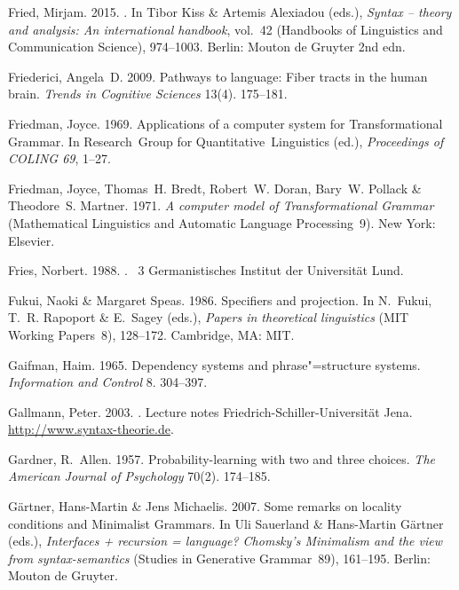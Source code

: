 \begin{thebibliography}{1420}
Fried, Mirjam. 2015.
.
\newblock In Tibor Kiss \& Artemis Alexiadou (eds.), \emph{Syntax -- theory and
  analysis: {An} international handbook}, vol.~42  (Handbooks of Linguistics
  and Communication Science), 974--1003. Berlin: Mouton de Gruyter 2nd edn.

Friederici, Angela~D. 2009.
\newblock Pathways to language: Fiber tracts in the human brain.
\newblock \emph{Trends in Cognitive Sciences} 13(4). 175--181.

Friedman, Joyce. 1969.
\newblock Applications of a computer system for {Transformational Grammar}.
\newblock In Research~Group for Quantitative~Linguistics (ed.),
  \emph{Proceedings of {COLING} 69}, 1--27.

Friedman, Joyce, Thomas~H. Bredt, Robert~W. Doran, Bary~W. Pollack \&
  Theodore~S. Martner. 1971.
\newblock \emph{A computer model of {Transformational Grammar}} (Mathematical
  Linguistics and Automatic Language Processing~9).
\newblock New York: Elsevier.

Fries, Norbert. 1988.
.
~3 Germanistisches Institut
  der Universit{\"a}t Lund.

Fukui, Naoki \& Margaret Speas. 1986.
\newblock Specifiers and projection.
\newblock In N.~Fukui, T.~R. Rapoport \& E.~Sagey (eds.), \emph{Papers in
  theoretical linguistics} (MIT Working Papers~8), 128--172. Cambridge, MA:
  MIT.

Gaifman, Haim. 1965.
\newblock Dependency systems and phrase"=structure systems.
\newblock \emph{Information and Control} 8. 304--397.

Gallmann, Peter. 2003.
.
\newblock Lecture notes {Friedrich-Schiller-Universit{\"a}t Jena}.
\newblock \urlprefix\url{http://www.syntax-theorie.de}.

Gardner, R.~Allen. 1957.
\newblock Probability-learning with two and three choices.
\newblock \emph{The American Journal of Psychology} 70(2). 174--185.

G{\"a}rtner, Hans-Martin \& Jens Michaelis. 2007.
\newblock Some remarks on locality conditions and {Minimalist Grammars}.
\newblock In Uli Sauerland \& Hans-Martin G{\"a}rtner (eds.), \emph{Interfaces
  + recursion = language? {Chomsky's Minimalism} and the view from
  syntax-semantics} (Studies in Generative Grammar~89), 161--195. Berlin:
  Mouton de Gruyter.


\end{thebibliography}

